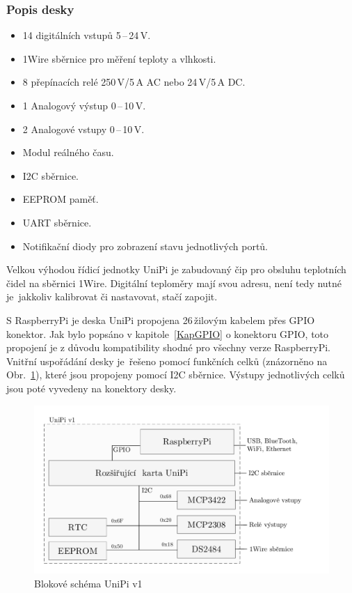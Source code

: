 \subsubsection{Popis desky}
\begin{itemize}
	\item 14 digitálních vstupů 5\,–\,24\,V. 
	\item 1Wire sběrnice pro měření teploty a vlhkosti. 
	\item 8 přepínacích relé 250\,V/5\,A AC nebo 24\,V/5\,A DC.
	\item 1 Analogový výstup 0\,–\,10\,V.
	\item 2 Analogové vstupy 0\,–\,10\,V.
	\item Modul reálného času.
	\item I2C sběrnice.
	\item EEPROM paměť.
	\item UART sběrnice.
	\item Notifikační diody pro zobrazení stavu jednotlivých portů.
\end{itemize}

\vspace{10pt}
Velkou výhodou řídicí jednotky UniPi je zabudovaný čip pro obsluhu teplotních čidel na sběrnici 1Wire. Digitální teploměry mají svou adresu, není tedy nutné je~jakkoliv kalibrovat či nastavovat, stačí zapojit.

S RaspberryPi je deska UniPi propojena 26\,žilovým kabelem přes GPIO konektor. Jak bylo popsáno v kapitole~\ref{KapGPIO} o konektoru GPIO, toto propojení je z důvodu kompatibility shodné pro všechny verze RaspberryPi. Vnitřní uspořádání desky je~řešeno pomocí funkčních celků  (znázorněno na Obr.~\ref{SchemaBlok1}), které jsou propojeny pomocí I2C sběrnice. Výstupy jednotlivých celků jsou poté vyvedeny na konektory desky.
 
\begin{figure}[!ht]
\vspace{-20pt}
  \begin{center}
    \includegraphics[scale=0.85]{obrazky/unipi_schema1}
  \end{center}
	\vspace{-30pt}
  \caption{Blokové schéma UniPi v1}
	\label{SchemaBlok1}
	
\end{figure}

